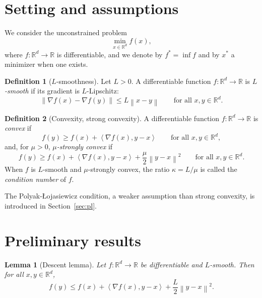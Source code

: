 \documentclass[11pt,a4paper]{article}
\newtheorem{lemma}{Lemma}
\theoremstyle{definition}
\newtheorem{definition}{Definition}
\theoremstyle{remark}
\newcommand{\R}{\mathbb{R}}
\newcommand{\norm}[1]{\left\lVert #1 \right\rVert}
\newcommand{\ip}[2]{\left\langle #1, #2 \right\rangle}
\begin{document}
\section{Setting and assumptions}\label{sec:setting}
We consider the unconstrained problem
\[
\min_{x \in \R^d} f(x),
\]
where $f : \R^d \to \R$ is differentiable, and we denote by $f^\ast = \inf f$ and by $x^\ast$ a minimizer when one exists.

\begin{definition}[$L$-smoothness]
Let $L > 0$. A differentiable function $f : \R^d \to \R$ is \emph{$L$-smooth} if its gradient is $L$-Lipschitz:
\[
\norm{\nabla f(x) - \nabla f(y)} \le L \norm{x - y} \qquad \text{for all } x, y \in \R^d.
\]
\end{definition}

\begin{definition}[Convexity, strong convexity]
A differentiable function $f : \R^d \to \R$ is \emph{convex} if
\[
f(y) \ge f(x) + \ip{\nabla f(x)}{y - x} \qquad \text{for all } x, y \in \R^d,
\]
and, for $\mu > 0$, \emph{$\mu$-strongly convex} if
\[
f(y) \ge f(x) + \ip{\nabla f(x)}{y - x} + \frac{\mu}{2}\norm{y - x}^2 \qquad \text{for all } x, y \in \R^d.
\]
When $f$ is $L$-smooth and $\mu$-strongly convex, the ratio $\kappa = L/\mu$ is called the \emph{condition number} of $f$.
\end{definition}

The Polyak-{\L}ojasiewicz condition, a weaker assumption than strong convexity, is introduced in Section~\ref{sec:pl}.

\section{Preliminary results}\label{sec:prelim}

\begin{lemma}[Descent lemma]\label{lem:descent}
Let $f : \R^d \to \R$ be differentiable and $L$-smooth. Then for all $x, y \in \R^d$,
\[
f(y) \le f(x) + \ip{\nabla f(x)}{y - x} + \frac{L}{2}\norm{y - x}^2 .
\]
\end{lemma}
\end{document}
